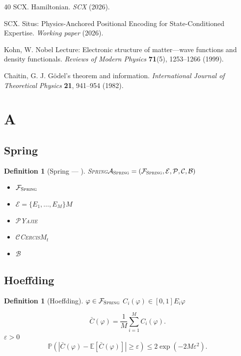 \documentclass[12pt,a4paper]{article}
\newtheorem{definition}[theorem]{Definition}
\theoremstyle{remark}
\newcommand{\E}{\mathbb{E}}
\newcommand{\Pbb}{\mathbb{P}}
\newcommand{\Fset}{\mathcal{F}}
\newcommand{\Spring}{\textsc{Spring}}
\newcommand{\Yajie}{\textsc{Yajie}}
\newcommand{\Cercis}{\textsc{Cercis}}
\begin{document}
\begin{thebibliography}{40}
SCX. Hamiltonian.
\textit{SCX} (2026).

SCX. Situs: Physics-Anchored Positional Encoding for State-Conditioned Expertise.
\textit{Working paper} (2026).

Kohn, W. Nobel Lecture: Electronic structure of matter---wave functions and density 
functionals.
\textit{Reviews of Modern Physics} \textbf{71}(5), 1253--1266 (1999).

Chaitin, G. J. G\"odel's theorem and information.
\textit{International Journal of Theoretical Physics} \textbf{21}, 941--954 (1982).

\end{thebibliography}

\newpage

\appendix
\section{A}

\subsection{Spring}

\begin{definition}[Spring — ]
\Spring{}$\mathcal{A}_{\Spring} = (\Fset_{\Spring}, \mathcal{E}, \mathcal{P}, \mathcal{C}, \mathcal{B})$
\begin{itemize}[itemsep=2pt]
    \item $\Fset_{\Spring}$
    \item $\mathcal{E} = \{E_1, \ldots, E_M\}$$M$
    \item $\mathcal{P}$\Yajie{}
    \item $\mathcal{C}$\Cercis{}$M_t$
    \item $\mathcal{B}$
\end{itemize}
\end{definition}

\subsection{Hoeffding}

\begin{definition}[Hoeffding]
$\varphi \in \Fset_{\Spring}$
$C_i(\varphi) \in [0, 1]$$E_i$$\varphi$

\begin{equation}
    \bar{C}(\varphi) = \frac{1}{M} \sum_{i=1}^M C_i(\varphi).
\end{equation}
$\varepsilon > 0$
\begin{equation}
    \Pbb(|\bar{C}(\varphi) - \E[\bar{C}(\varphi)]| \geq \varepsilon) \leq 2\exp(-2M\varepsilon^2).
\end{equation}
\end{definition}
\end{document}
